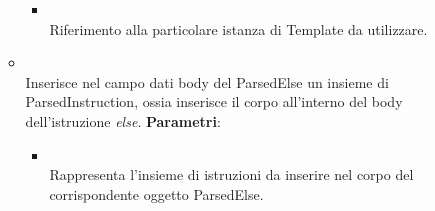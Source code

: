 \begin{itemize}
\begin{itemize}
\begin{itemize}
\item {}
\\ Riferimento alla particolare istanza di Template da utilizzare.
\end{itemize}
\item {}
\\ Inserisce nel campo dati body del ParsedElse un insieme di ParsedInstruction, ossia inserisce il corpo all'interno del body dell'istruzione \emph{else}.
\textbf{Parametri}:
\begin{itemize}
\item {}
\\ Rappresenta l'insieme di istruzioni da inserire nel corpo del corrispondente oggetto ParsedElse.
\end{itemize}
\end{itemize}
\end{itemize}


